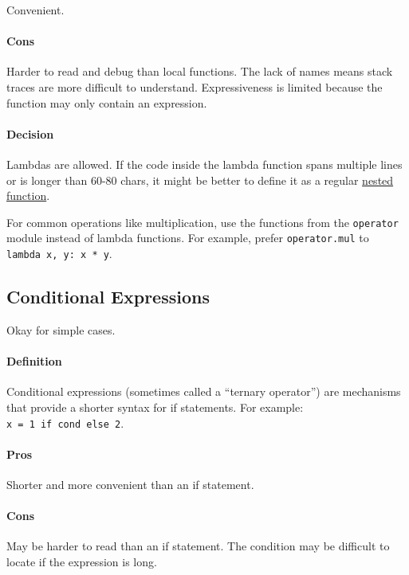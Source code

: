 \documentclass[
]{article}
\begin{document}
Convenient.

\paragraph{Cons}

Harder to read and debug than local functions. The lack of names means
stack traces are more difficult to understand. Expressiveness is limited
because the function may only contain an expression.

\paragraph{Decision}

Lambdas are allowed. If the code inside the lambda function spans
multiple lines or is longer than 60-80 chars, it might be better to
define it as a regular \hyperref[lexical-scoping]{nested function}.

For common operations like multiplication, use the functions from the
\texttt{operator} module instead of lambda functions. For example,
prefer \texttt{operator.mul} to \texttt{lambda\ x,\ y:\ x\ *\ y}.

\subsection{Conditional Expressions}

Okay for simple cases.

\paragraph{Definition}

Conditional expressions (sometimes called a ``ternary operator'') are
mechanisms that provide a shorter syntax for if statements. For example:
\texttt{x\ =\ 1\ if\ cond\ else\ 2}.

\paragraph{Pros}

Shorter and more convenient than an if statement.

\paragraph{Cons}

May be harder to read than an if statement. The condition may be
difficult to locate if the expression is long.
\end{document}
